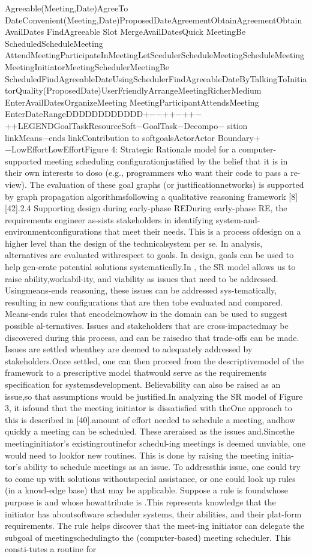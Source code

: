 Agreeable(Meeting,Date)AgreeTo DateConvenient(Meeting,Date)ProposedDateAgreementObtainAgreementObtainAvailDates  FindAgreeable  Slot   MergeAvailDatesQuick MeetingBe ScheduledScheduleMeeting AttendMeetingParticipateInMeetingLetScedulerScheduleMeetingScheduleMeetingMeetingInitiatorMeetingSchedulerMeetingBe ScheduledFindAgreeableDateUsingSchedulerFindAgreeableDateByTalkingToInitiatorQuality(ProposedDate)UserFriendlyArrangeMeetingRicherMedium  EnterAvailDatesOrganizeMeeting MeetingParticipantAttendsMeeting    EnterDateRangeDDDDDDDDDDDD+−−++−++−++LEGENDGoalTaskResourceSoft−GoalTask−Decompo−   sition linkMeans−ends linkContribution to    softgoalsActorActor Boundary+−LowEffortLowEffortFigure 4: Strategic Rationale model for a computer-supported meeting scheduling conﬁgurationjustiﬁed by the belief that it is in their own interests to doso (e.g., programmers who want their code to pass a re-view). The evaluation of these goal graphs (or justiﬁcationnetworks) is supported by graph propagation algorithmsfollowing a qualitative reasoning framework [8] [42].2.4 Supporting design during early-phase REDuring early-phase RE, the requirements engineer as-sists stakeholders in identifying system-and-environmentconﬁgurations that meet their needs. This is a process ofdesign on a higher level than the design of the technicalsystem per se. In analysis, alternatives are evaluated withrespect to goals. In design, goals can be used to help gen-erate potential solutions systematically.In , the SR model allows us to raise ability,workabil-ity, and viability as issues that need to be addressed. Usingmeans-ends reasoning, these issues can be addressed sys-tematically, resulting in new conﬁgurations that are then tobe evaluated and compared. Means-ends rules that encodeknowhow in the domain can be used to suggest possible al-ternatives. Issues and stakeholders that are cross-impactedmay be discovered during this process, and can be raisedso that trade-offs can be made. Issues are settled whenthey are deemed to adequately addressed by stakeholders.Once settled, one can then proceed from the descriptivemodel of the framework to a prescriptive model thatwould serve as the requirements speciﬁcation for systemsdevelopment. Believability can also be raised as an issue,so that assumptions would be justiﬁed.In analyzing the SR model of Figure 3, it isfound that the meeting initiator is dissatisﬁed with theOne approach to this is described in [40].amount of effort needed to schedule a meeting, andhow quickly a meeting can be scheduled. These areraised as the issues and.Sincethe meetinginitiator’s existingroutinefor schedul-ing meetings is deemed unviable, one would need to lookfor new routines. This is done by raising the meeting initia-tor’s ability to schedule meetings as an issue. To addressthis issue, one could try to come up with solutions withoutspecial assistance, or one could look up rules (in a knowl-edge base) that may be applicable. Suppose a rule is foundwhose purpose is and whose howattribute is .This represents knowledge that the initiator has aboutsoftware scheduler systems, their abilities, and their plat-form requirements. The rule helps discover that the meet-ing initiator can delegate the subgoal of meetingschedulingto the (computer-based) meeting scheduler. This consti-tutes a routine for 
